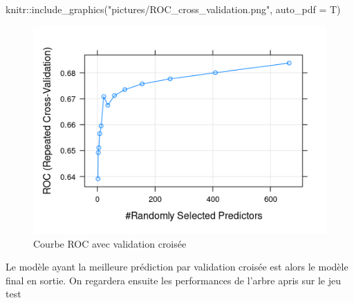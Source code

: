 \documentclass[
  12pt,
]{article}
\newenvironment{Shaded}{\begin{snugshade}}{\end{snugshade}}
\newcommand{\AttributeTok}[1]{\textcolor[rgb]{0.77,0.63,0.00}{#1}}
\newcommand{\CommentTok}[1]{\textcolor[rgb]{0.56,0.35,0.01}{\textit{#1}}}
\newcommand{\FunctionTok}[1]{\textcolor[rgb]{0.00,0.00,0.00}{#1}}
\newcommand{\NormalTok}[1]{#1}
\newcommand{\OtherTok}[1]{\textcolor[rgb]{0.56,0.35,0.01}{#1}}
\newcommand{\SpecialCharTok}[1]{\textcolor[rgb]{0.00,0.00,0.00}{#1}}
\newcommand{\StringTok}[1]{\textcolor[rgb]{0.31,0.60,0.02}{#1}}
\begin{document}
\begin{Shaded}
\begin{Highlighting}[]
\NormalTok{knitr}\SpecialCharTok{::}\FunctionTok{include\_graphics}\NormalTok{(}\StringTok{"pictures/ROC\_cross\_validation.png"}\NormalTok{, }\AttributeTok{auto\_pdf =}\NormalTok{ T)}
\end{Highlighting}
\end{Shaded}

\begin{figure}

{\centering \includegraphics[width=6.62in]{pictures/ROC_cross_validation} 

}

\caption{ Courbe ROC avec validation croisée}\label{fig:ROC}
\end{figure}

Le modèle ayant la meilleure prédiction par validation croisée est alors
le modèle final en sortie. On regardera ensuite les performances de
l'arbre apris sur le jeu test

\begin{Shaded}
\end{Shaded}
\end{document}
